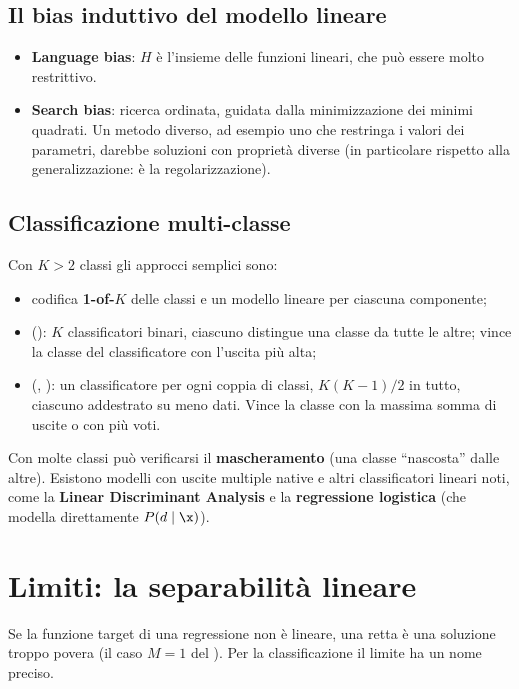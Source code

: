 \subsection{Il bias induttivo del modello lineare}

\begin{itemize}
  \item \textbf{Language bias}: $H$ è l'insieme delle funzioni lineari, che può essere molto restrittivo.
  \item \textbf{Search bias}: ricerca ordinata, guidata dalla minimizzazione dei minimi quadrati. Un metodo
        diverso, ad esempio uno che restringa i valori dei parametri, darebbe soluzioni con proprietà diverse
        (in particolare rispetto alla generalizzazione: è la regolarizzazione).
\end{itemize}

\subsection{Classificazione multi-classe}

Con $K>2$ classi gli approcci semplici sono:
\begin{itemize}
  \item codifica \textbf{1-of-$K$} delle classi e un modello lineare per ciascuna componente;
  \item {} (): $K$ classificatori binari, ciascuno distingue una classe da tutte le
        altre; vince la classe del classificatore con l'uscita più alta;
  \item {} (, ): un classificatore per ogni coppia di classi,
        $K(K-1)/2$ in tutto, ciascuno addestrato su meno dati. Vince la classe con la massima somma di uscite o
        con più voti.
\end{itemize}
Con molte classi può verificarsi il \textbf{mascheramento} (una classe ``nascosta'' dalle altre). Esistono
modelli con uscite multiple native e altri classificatori lineari noti, come la \textbf{Linear Discriminant
Analysis} e la \textbf{regressione logistica} (che modella direttamente $P(d\mid\x)$).

\section{Limiti: la separabilità lineare}
\label{sec:separabilita}

Se la funzione target di una regressione non è lineare, una retta è una soluzione troppo povera (il caso $M=1$
del ). Per la classificazione il limite ha un nome preciso.

